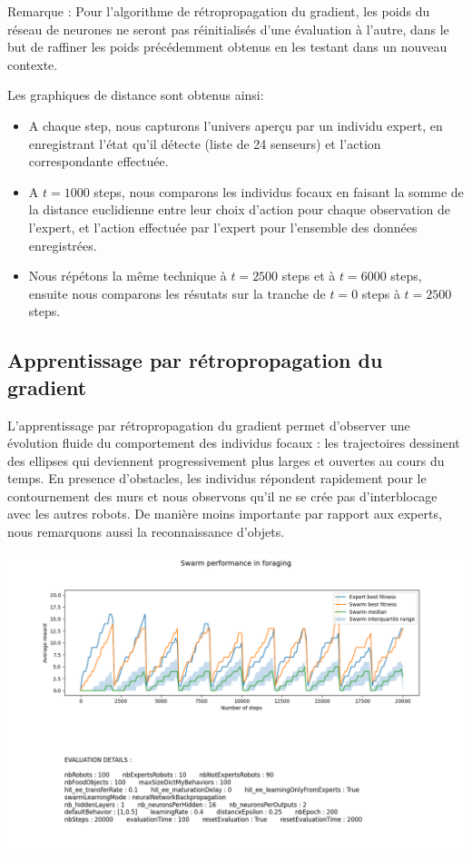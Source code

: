 \documentclass[a4paper, 12pt]{report}
\begin{document}
    Remarque : Pour l'algorithme de rétropropagation du gradient, les poids du réseau de neurones ne seront pas réinitialisés d'une évaluation à l'autre, dans le but de raffiner les poids précédemment obtenus en les testant dans un nouveau contexte.
    
    Les graphiques de distance sont obtenus ainsi:
    \begin{itemize}
        \item A chaque step, nous capturons l'univers aperçu par un individu expert, en enregistrant l'état qu'il détecte (liste de 24 senseurs) et l'action correspondante effectuée.
        \item A $t = 1000$ steps, nous comparons les individus focaux en faisant la somme de la distance euclidienne entre leur choix d'action pour chaque observation de l'expert, et l'action effectuée par l'expert pour l'ensemble des données enregistrées.
        \item Nous répétons la même technique à $t = 2500$ steps et à $t = 6000$ steps, ensuite nous comparons les résutats sur la tranche de $t = 0$ steps à $t = 2500$ steps.
    \end{itemize}


	
	
    \subsection{Apprentissage par rétropropagation du gradient}
    
    L'apprentissage par rétropropagation du gradient permet d'observer une évolution fluide du comportement des individus focaux : les trajectoires dessinent des ellipses qui deviennent progressivement plus larges et ouvertes au cours du temps. En presence d'obstacles, les individus répondent rapidement pour le contournement des murs et nous observons qu'il ne se crée pas d'interblocage avec les autres robots. De manière moins importante par rapport aux experts, nous remarquons aussi la reconnaissance d'objets.
    
    \includegraphics[scale=0.5]{images/data_performance_20000_100_bp.png}
    
\end{document}
